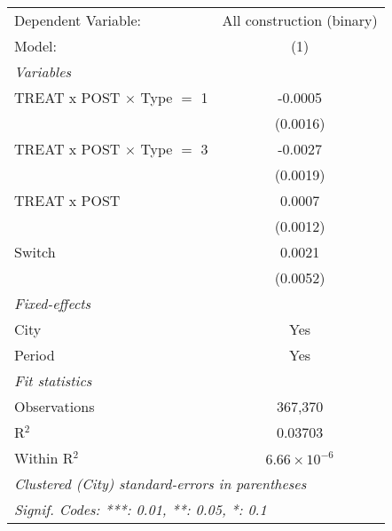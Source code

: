 \begingroup
\centering
\begin{tabular}{lc}
   \tabularnewline \midrule \midrule
   Dependent Variable:               & All construction (binary)\\  
   Model:                            & (1)\\  
   \midrule
   \emph{Variables}\\
   TREAT x POST $\times$ Type $=$ 1  & -0.0005\\   
                                     & (0.0016)\\   
   TREAT x POST $\times$ Type $=$ 3  & -0.0027\\   
                                     & (0.0019)\\   
   TREAT x POST                      & 0.0007\\   
                                     & (0.0012)\\   
   Switch                            & 0.0021\\   
                                     & (0.0052)\\   
   \midrule
   \emph{Fixed-effects}\\
   City                              & Yes\\  
   Period                            & Yes\\  
   \midrule
   \emph{Fit statistics}\\
   Observations                      & 367,370\\  
   R$^2$                             & 0.03703\\  
   Within R$^2$                      & $6.66\times 10^{-6}$\\   
   \midrule \midrule
   \multicolumn{2}{l}{\emph{Clustered (City) standard-errors in parentheses}}\\
   \multicolumn{2}{l}{\emph{Signif. Codes: ***: 0.01, **: 0.05, *: 0.1}}\\
\end{tabular}
\par\endgroup
